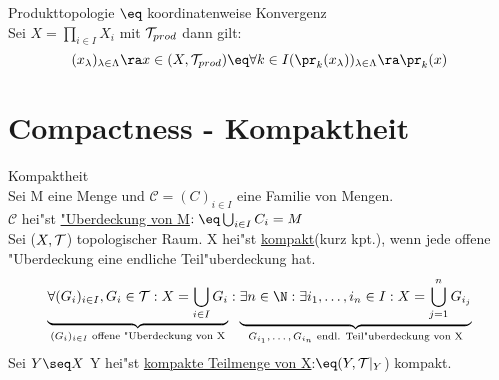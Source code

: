 \begin{prop}\label{5.7}{Produkttopologie $\eq$ koordinatenweise Konvergenz}\\
Sei $X=\prod_{i\in I}X_i$ mit $\mathcal T_{prod}$ dann gilt:
$$(x_\lambda )_{\lambda\in\Lambda}\ra x\in (X,\T_{prod})\eq\forall k\in I (\pr_k(x_\lambda ))_{\lambda\in\Lambda}\ra \pr_k(x)$$
\end{prop}
\section{Compactness - Kompaktheit}
\begin{definition}\label{6.1}{Kompaktheit}\\
Sei M eine Menge und $\mathcal{C}=(C)_{i\in I}$ eine Familie von Mengen.\\
$\mathcal{C}$ hei"st \ul{"Uberdeckung von M}$:\eq \bigcup_{i\in I} C_i = M$\\
Sei ($X,\mathcal T$) topologischer Raum. X hei"st \ul{kompakt}(kurz kpt.), wenn jede offene "Uberdeckung eine endliche Teil"uberdeckung hat.\vspace*{-0.3cm}\\
$$\underbrace{\forall (G_i)_{i\in I}, G_i\in\T : X = \bigcup_{i\in I}G_i}_{\mbox{\scriptsize $(G_i)_{i\in I}$ offene "Uberdeckung von X}}:\underbrace{\exists n\in\N: \exists i_1,\dots ,i_n\in I: X = \bigcup_{j=1}^nG_{i_j}}_{\mbox{\scriptsize $G_{i_1},\dots ,G_{i_n}$ endl. Teil"uberdeckung von X}}$$
Sei $Y\seq X$ Y hei"st \ul{kompakte Teilmenge von X}:$\eq (Y,\T |_Y$) kompakt.
\end{definition}

